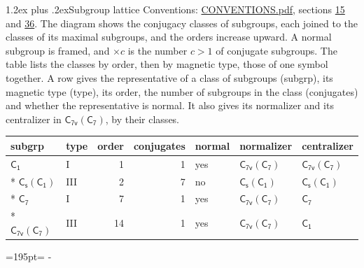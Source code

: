 \documentclass[10pt,a4paper]{article}
\makeatletter
\renewcommand\section{\@startsection{section}{1}{\z@}{-3ex plus -1ex minus -.2ex}%
  {1.2ex plus .2ex}{\normalfont\large\sffamily\bfseries\color{parttitle}}}
\newcommand{\needspace}[1]{\par\penalty-100\begingroup\dimen0=#1\relax\dimen2=\pagegoal
  \advance\dimen2-\pagetotal\ifdim\dimen0>\dimen2\relax\ifdim\dimen2>0pt\vfil\break\fi\fi
  \endgroup}
\numberwithin{equation}{section}
\newcommand{\grp}[1]{\mathsf{#1}}
\newcommand{\nconj}[1]{{\scriptsize$\times#1$}}
\makeatother
\begin{document}
\section{Subgroup lattice}\label{s:subgroups}
Conventions: \href{../../CONVENTIONS.pdf}{CONVENTIONS.pdf}, sections \href{../../../rotation/CONVENTIONS.pdf\#conv.15}{15} and \href{../../CONVENTIONS.pdf\#conv.36}{36}.
The diagram shows the conjugacy classes of subgroups, each joined to the classes of its maximal subgroups, and the orders increase upward. \label{n:index.conjugates.c}\label{n:mark.conjugates}A normal subgroup is framed, and ${\times}c$ is the number $c > 1$ of conjugate subgroups. The table lists the classes by order, then by magnetic type, those of one symbol together. \label{n:head.subgroup}\label{n:head.magnetic.type}\label{n:head.order}\label{n:head.conjugates}\label{n:head.normal}A row gives the representative of a class of subgroups (subgrp), its magnetic type (type), its order, the number of subgroups in the class (conjugates) and whether the representative is normal. \label{n:head.normalizer}\label{n:head.centralizer}It also gives its normalizer and its centralizer in $\grp{C_{7v}}(\grp{C_{7}})$, by their classes. 
\begin{center}
\end{center}
{\small\begin{longtable}{@{}llrrlll@{}}\toprule
subgrp & type & order & conjugates & normal & normalizer & centralizer\\\midrule\endhead
\bottomrule\endfoot\endlastfoot
\href{../../../rotation/data/pdf/C1.pdf}{$\grp{C_{1}}$} & I & 1 & 1 & yes & \href{C7v-C7.pdf}{$\grp{C_{7v}}(\grp{C_{7}})$} & \href{C7v-C7.pdf}{$\grp{C_{7v}}(\grp{C_{7}})$}\\*
\href{C1v-C1.pdf}{$\grp{C_{s}}(\grp{C_{1}})$} & III & 2 & 7 & no & \href{C1v-C1.pdf}{$\grp{C_{s}}(\grp{C_{1}})$} & \href{C1v-C1.pdf}{$\grp{C_{s}}(\grp{C_{1}})$}\\*
\href{../../../rotation/data/pdf/C7.pdf}{$\grp{C_{7}}$} & I & 7 & 1 & yes & \href{C7v-C7.pdf}{$\grp{C_{7v}}(\grp{C_{7}})$} & \href{../../../rotation/data/pdf/C7.pdf}{$\grp{C_{7}}$}\\*
\href{C7v-C7.pdf}{$\grp{C_{7v}}(\grp{C_{7}})$} & III & 14 & 1 & yes & \href{C7v-C7.pdf}{$\grp{C_{7v}}(\grp{C_{7}})$} & \href{../../../rotation/data/pdf/C1.pdf}{$\grp{C_{1}}$}\\
\bottomrule\end{longtable}}
\needspace{195pt}
\end{document}
